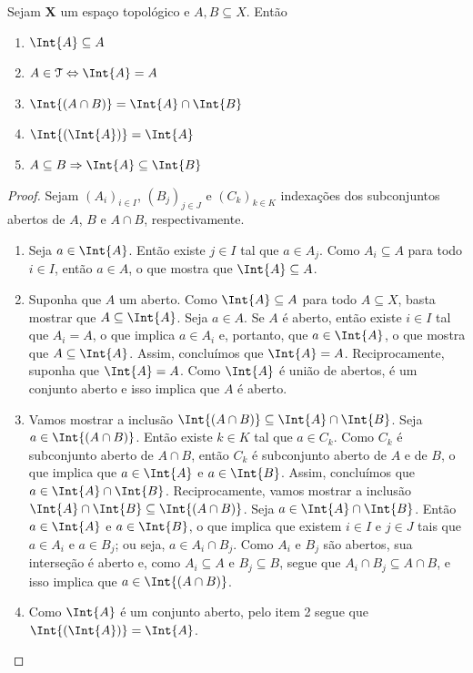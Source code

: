 \begin{prop}
	Sejam $\bm X$ um espaço topológico e $A,B \subseteq X$. Então
	\begin{enumerate}
	\item $\Int{A} \subseteq A$
	\item $A \in \topo \Leftrightarrow \Int{A}=A$
	\item $\Int{(A \cap B)} = \Int{A} \cap \Int{B}$
	\item $\Int{(\Int{A})} = \Int{A}$
	\item $A \subseteq B \Rightarrow \Int{A} \subseteq \Int{B}$
	\end{enumerate}
\end{prop}
\begin{proof} Sejam $(A_i)_{i \in I}$, $(B_j)_{j \in J}$ e $(C_k)_{k \in K}$ indexações dos subconjuntos abertos de $A$, $B$ e $A \cap B$, respectivamente.
	\begin{enumerate}
	\item Seja $a \in \Int{A}$. Então existe $j \in I$ tal que $a \in A_j$. Como $A_i \subseteq A$ para todo $i \in I$, então $a \in A$, o que mostra que $\Int{A} \subseteq A$.
	
	\item Suponha que $A$ um aberto. Como $\Int{A} \subseteq A$ para todo $A \subseteq X$, basta mostrar que $A \subseteq \Int{A}$. Seja $a \in A$.	Se $A$ é aberto, então existe $i \in I$ tal que $A_i = A$, o que implica $a \in A_i$ e, portanto, que $a \in \Int{A}$, o que mostra que $A \subseteq \Int{A}$. Assim, concluímos que $\Int{A}=A$. Reciprocamente, suponha que $\Int{A}=A$. Como $\Int{A}$ é união de abertos, é um conjunto aberto e isso implica que $A$ é aberto.
	
	\item Vamos mostrar a inclusão $\Int{(A \cap B)} \subseteq \Int{A} \cap \Int{B}$. Seja $a \in \Int{(A \cap B)}$. Então existe $k \in K$ tal que $a \in C_k$. Como $C_k$ é subconjunto aberto de $A \cap B$, então $C_k$ é subconjunto aberto de $A$ e de $B$, o que implica que $a \in \Int{A}$ e $a \in \Int{B}$. Assim, concluímos que $a \in \Int{A} \cap \Int{B}$. Reciprocamente, vamos mostrar a inclusão $\Int{A} \cap \Int{B} \subseteq \Int{(A \cap B)}$. Seja $a \in \Int{A} \cap \Int{B}$. Então $a \in \Int{A}$ e $a \in \Int{B}$, o que implica que existem $i \in I$ e $j \in J$ tais que $a \in A_i$ e $a \in B_j$; ou seja, $a \in A_i \cap B_j$. Como $A_i$ e $B_j$ são abertos, sua interseção é aberto e, como $A_i \subseteq A$ e $B_j \subseteq B$, segue que $A_i \cap B_j \subseteq A \cap B$, e isso implica que $a \in \Int{(A \cap B)}$.
	
	\item Como $\Int{A}$ é um conjunto aberto, pelo item 2 segue que $\Int{(\Int{A})} = \Int{A}$.
\qedhere	
	\end{enumerate}
\end{proof}

